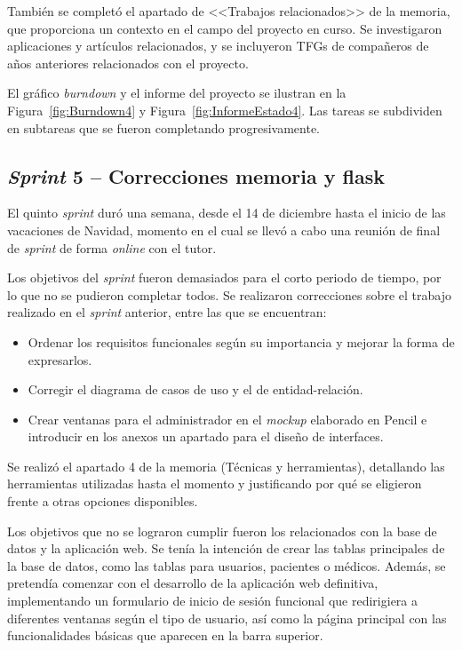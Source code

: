 También se completó el apartado de <<Trabajos relacionados>> de la memoria, que proporciona un contexto en el campo del proyecto en curso. Se investigaron aplicaciones y artículos relacionados, y se incluyeron TFGs de compañeros de años anteriores relacionados con el proyecto.

El gráfico \textit{burndown} y el informe del proyecto se ilustran en la Figura~\ref{fig:Burndown4} y Figura~\ref{fig:InformeEstado4}. Las tareas se subdividen en subtareas que se fueron completando progresivamente. 


\subsection{\textit{Sprint} 5 – Correcciones memoria y flask}
El quinto \textit{sprint} duró una semana, desde el 14 de diciembre hasta el inicio de las vacaciones de Navidad, momento en el cual se llevó a cabo una reunión de final de \textit{sprint} de forma \textit{online} con el tutor.

Los objetivos del \textit{sprint} fueron demasiados para el corto periodo de tiempo, por lo que no se pudieron completar todos.
Se realizaron correcciones sobre el trabajo realizado en el \textit{sprint} anterior, entre las que se encuentran:
\begin{itemize}
    \item Ordenar los requisitos funcionales según su importancia y mejorar la forma de expresarlos.
    \item Corregir el diagrama de casos de uso y el de entidad-relación.
    \item Crear ventanas para el administrador en el \textit{mockup} elaborado en Pencil e introducir en los anexos un apartado para el diseño de interfaces.
\end{itemize}

Se realizó el apartado 4 de la memoria (Técnicas y herramientas), detallando las herramientas utilizadas hasta el momento y justificando por qué se eligieron frente a otras opciones disponibles.

Los objetivos que no se lograron cumplir fueron los relacionados con la base de datos y la aplicación web. Se tenía la intención de crear las tablas principales de la base de datos, como las tablas para usuarios, pacientes o médicos. Además, se pretendía comenzar con el desarrollo de la aplicación web definitiva, implementando un formulario de inicio de sesión funcional que redirigiera a diferentes ventanas según el tipo de usuario, así como la página principal con las funcionalidades básicas que aparecen en la barra superior.

